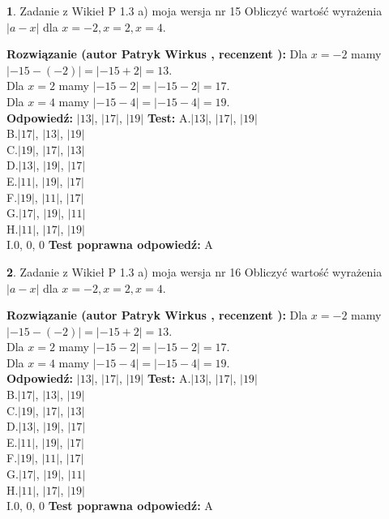 \documentclass[12pt, a4paper]{article}
\theoremstyle{definition} %
\newtheorem{zad}{}
\newcommand{\zadStart}[1]{\begin{zad}#1\newline}
\newcommand{\zadStop}{\end{zad}}
\newcommand{\rozwStart}[2]{\noindent \textbf{Rozwiązanie (autor #1 , recenzent #2): }\newline}
\newcommand{\rozwStop}{\newline}
\newcommand{\odpStart}{\noindent \textbf{Odpowiedź:}\newline}
\newcommand{\odpStop}{\newline}
\newcommand{\testStart}{\noindent \textbf{Test:}\newline}
\newcommand{\testStop}{\newline}
\newcommand{\kluczStart}{\noindent \textbf{Test poprawna odpowiedź:}\newline}
\newcommand{\kluczStop}{\newline}
\begin{document}
\zadStart{Zadanie z Wikieł P 1.3 a) moja wersja nr 15}
Obliczyć wartość wyrażenia $|a - x|$ dla $x=-2,x=2,x=4$.
\zadStop
\rozwStart{Patryk Wirkus}{}
Dla $x = -2$ mamy $|-15 - (-2)| = |-15 + 2| = 13$.\\
Dla $x = 2$ mamy $|-15 - 2| = |-15 - 2| = 17$.\\
Dla $x = 4$ mamy $|-15 - 4| = |-15 - 4| = 19$.\\
\rozwStop
\odpStart
$|13|$, $|17|$, $|19|$
\odpStop
\testStart
A.$|13|$, $|17|$, $|19|$\\
B.$|17|$, $|13|$, $|19|$\\
C.$|19|$, $|17|$, $|13|$\\
D.$|13|$, $|19|$, $|17|$\\
E.$|11|$, $|19|$, $|17|$\\
F.$|19|$, $|11|$, $|17|$\\
G.$|17|$, $|19|$, $|11|$\\
H.$|11|$, $|17|$, $|19|$\\
I.$0$, $0$, $0$
\testStop
\kluczStart
A
\kluczStop



\zadStart{Zadanie z Wikieł P 1.3 a) moja wersja nr 16}
Obliczyć wartość wyrażenia $|a - x|$ dla $x=-2,x=2,x=4$.
\zadStop
\rozwStart{Patryk Wirkus}{}
Dla $x = -2$ mamy $|-15 - (-2)| = |-15 + 2| = 13$.\\
Dla $x = 2$ mamy $|-15 - 2| = |-15 - 2| = 17$.\\
Dla $x = 4$ mamy $|-15 - 4| = |-15 - 4| = 19$.\\
\rozwStop
\odpStart
$|13|$, $|17|$, $|19|$
\odpStop
\testStart
A.$|13|$, $|17|$, $|19|$\\
B.$|17|$, $|13|$, $|19|$\\
C.$|19|$, $|17|$, $|13|$\\
D.$|13|$, $|19|$, $|17|$\\
E.$|11|$, $|19|$, $|17|$\\
F.$|19|$, $|11|$, $|17|$\\
G.$|17|$, $|19|$, $|11|$\\
H.$|11|$, $|17|$, $|19|$\\
I.$0$, $0$, $0$
\testStop
\kluczStart
A
\kluczStop
\end{document}
